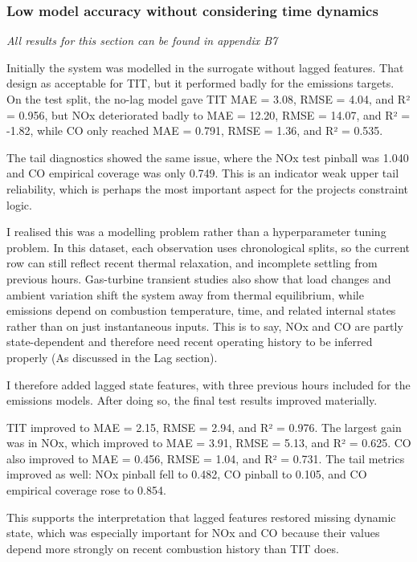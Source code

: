 \documentclass[11pt]{article}
\begin{document}
\subsubsection{\texorpdfstring{Low model accuracy without considering
time dynamics
}{Low model accuracy without considering time dynamics }}\label{low-model-accuracy-without-considering-time-dynamics}

\emph{All results for this section can be found in appendix B7}

Initially the system was modelled in the surrogate without lagged
features. That design as acceptable for TIT, but it performed badly for
the emissions targets. On the test split, the no-lag model gave TIT MAE
= 3.08, RMSE = 4.04, and R² = 0.956, but NOx deteriorated badly to MAE =
12.20, RMSE = 14.07, and R² = -1.82, while CO only reached MAE = 0.791,
RMSE = 1.36, and R² = 0.535.

The tail diagnostics showed the same issue, where the NOx test pinball
was 1.040 and CO empirical coverage was only 0.749. This is an indicator
weak upper tail reliability, which is perhaps the most important aspect
for the projects constraint logic.

I realised this was a modelling problem rather than a hyperparameter
tuning problem. In this dataset, each observation uses chronological
splits, so the current row can still reflect recent thermal relaxation,
and incomplete settling from previous hours. Gas-turbine transient
studies also show that load changes and ambient variation shift the
system away from thermal equilibrium, while emissions depend on
combustion temperature, time, and related internal states rather than on
just instantaneous inputs. This is to say, NOx and CO are partly
state-dependent and therefore need recent operating history to be
inferred properly (As discussed in the Lag section).

I therefore added lagged state features, with three previous hours
included for the emissions models. After doing so, the final test
results improved materially.

TIT improved to MAE = 2.15, RMSE = 2.94, and R² = 0.976. The largest
gain was in NOx, which improved to MAE = 3.91, RMSE = 5.13, and R² =
0.625. CO also improved to MAE = 0.456, RMSE = 1.04, and R² = 0.731. The
tail metrics improved as well: NOx pinball fell to 0.482, CO pinball to
0.105, and CO empirical coverage rose to 0.854.

This supports the interpretation that lagged features restored missing
dynamic state, which was especially important for NOx and CO because
their values depend more strongly on recent combustion history than TIT
does.
\end{document}
